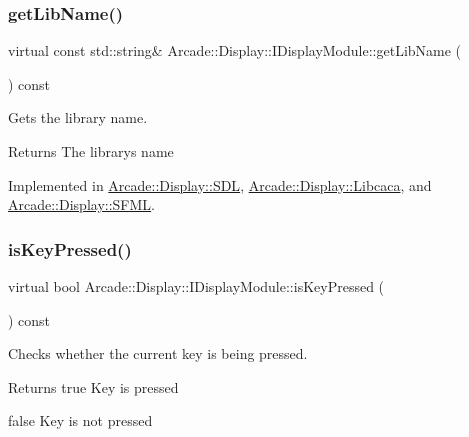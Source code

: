\subsubsection{\texorpdfstring{getLibName()}{getLibName()}}
{\footnotesize\ttfamily virtual const std\+::string\& Arcade\+::\+Display\+::\+I\+Display\+Module\+::get\+Lib\+Name (\begin{DoxyParamCaption}{ }\end{DoxyParamCaption}) const\hspace{0.3cm}{\ttfamily [pure virtual]}}



Gets the library name. 

\begin{DoxyReturn}{Returns}
The library\textquotesingle{}s name 
\end{DoxyReturn}


Implemented in \mbox{\hyperlink{classArcade_1_1Display_1_1SDL_aa549d6ec470b99b545db63a1d4a2b58e}{Arcade\+::\+Display\+::\+S\+DL}}, \mbox{\hyperlink{classArcade_1_1Display_1_1Libcaca_a26e6dd02a853963fdcb812bddb3dee1e}{Arcade\+::\+Display\+::\+Libcaca}}, and \mbox{\hyperlink{classArcade_1_1Display_1_1SFML_a8c323cea968403cb2edf791d37dc7887}{Arcade\+::\+Display\+::\+S\+F\+ML}}.

\mbox{\label{classArcade_1_1Display_1_1IDisplayModule_ab3d02b76c08ff2deb728dc9f0d557f43}} 
\subsubsection{\texorpdfstring{isKeyPressed()}{isKeyPressed()}}
{\footnotesize\ttfamily virtual bool Arcade\+::\+Display\+::\+I\+Display\+Module\+::is\+Key\+Pressed (\begin{DoxyParamCaption}\item[{\mbox{\hyperlink{classArcade_1_1Display_1_1IDisplayModule_a8da3f6b309ca0581473ae8cc8789b619}{I\+Display\+Module\+::\+Keys}}}]{ }\end{DoxyParamCaption}) const\hspace{0.3cm}{\ttfamily [pure virtual]}}



Checks whether the current key is being pressed. 

\begin{DoxyReturn}{Returns}
true Key is pressed 

false Key is not pressed 
\end{DoxyReturn}


